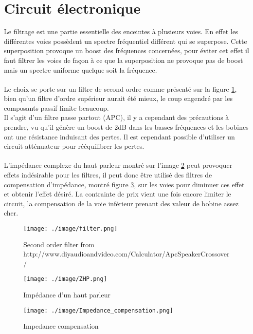\documentclass[a4paper,english]{report}
\begin{document}
			\section{Circuit électronique}
			Le filtrage est une partie essentielle des enceintes à plusieurs voies. En effet les différentes voies possèdent un spectre fréquentiel différent qui se superpose. Cette superposition provoque un boost des fréquences concernées, pour éviter cet effet il faut filtrer les voies de façon à ce que la superposition ne provoque pas de boost mais un spectre uniforme quelque soit la fréquence.\\
			\\
			Le choix se porte sur un filtre de second ordre comme présenté sur la figure \ref{filter}, bien qu'un filtre d'ordre supérieur aurait été mieux, le coup engendré par les composants passif limite beaucoup.\\
			Il s'agit d'un filtre passe partout (APC), il y a cependant des précautions à prendre, vu qu'il génère un boost de 2dB dans les basses fréquences et les bobines ont une résistance induisant des pertes. Il est cependant possible d'utiliser un circuit atténuateur pour rééquilibrer les pertes.\\ 
			\\
			L'impédance complexe du haut parleur montré sur l'image \ref{Zimp} peut provoquer effets indésirable pour les filtres, il peut donc être utilisé des filtres de compensation d'impédance, montré figure \ref{impcomp},  sur les voies pour diminuer ces effet et obtenir l'effet désiré. La contrainte de prix vient une fois encore limiter le circuit, la compensation de la voie inférieur prenant des valeur de bobine assez cher.\\
			
 				\begin{figure}[H]
 					\centering
 					\texttt{[image: ./image/filter.png]}
 					\label{filter}
 					\caption{Second order filter from  http://www.diyaudioandvideo.com/Calculator/ApcSpeakerCrossover/ }
 				\end{figure}				
			
 				\begin{figure}[H]
 					\centering
 					\texttt{[image: ./image/ZHP.png]}
 					\label{Zimp}
 					\caption{Impédance d'un haut parleur }
 				\end{figure}
 					\begin{figure}[H]
 						\centering
 						\texttt{[image: ./image/Impedance\_compensation.png]}
 						\label{impcomp}
 						\caption{Impedance compensation }
 					\end{figure}
 			
\end{document}
